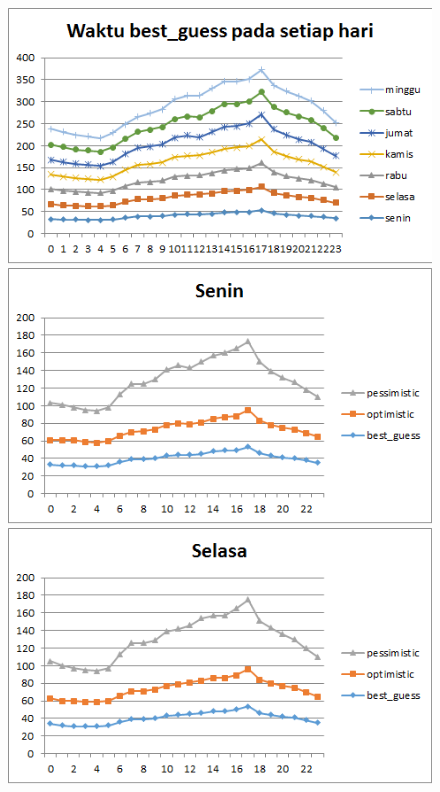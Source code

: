 \begin{figure}[H]
				\centering		
				\includegraphics[]{Gambar/waktubestguesssampel108052017.png}
				\includegraphics[]{Gambar/seninsampel108052017.png}
				\includegraphics[]{Gambar/selasasampel108052017.png}
			\end{figure}			
			
